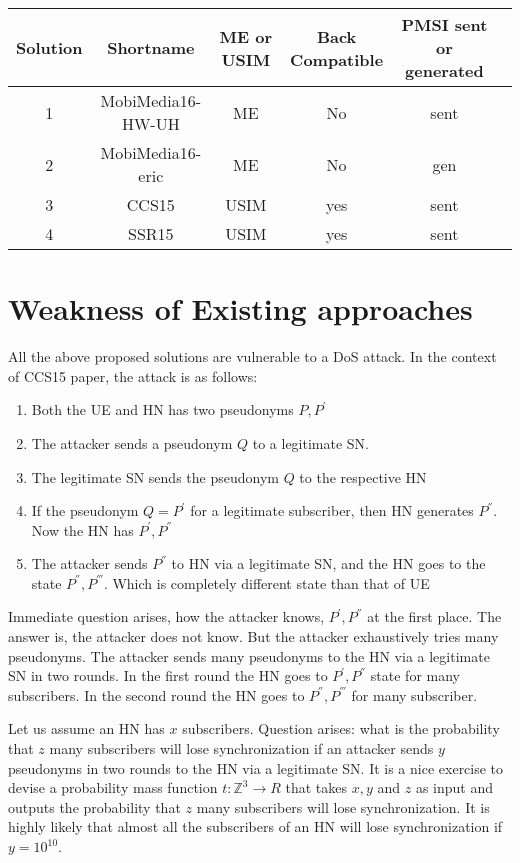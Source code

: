 \documentclass[runningheads,a4paper]{llncs} %
\begin{document}
\begin{center}
\begin{tabular}{ |c|c|c|c|c|c|} 
\hline
Solution & Shortname & ME or USIM & Back Compatible & PMSI sent or generated \\
\hline
1 & MobiMedia16-HW-UH & ME & No & sent\\ 
\hline
2 & MobiMedia16-eric  & ME & No & gen\\ 
\hline
3 & CCS15 & USIM & yes & sent\\ 
\hline
4 & SSR15 & USIM & yes & sent\\ 
\hline
\end{tabular}
\end{center}

\section{Weakness of Existing approaches}
All the above proposed solutions are vulnerable to a DoS attack. In the context of CCS15 paper, the attack is as follows:

\begin{enumerate}
\item Both the UE and HN has two pseudonyms $P,P^{'}$
\item The attacker sends a pseudonym $Q$ to a legitimate SN.
\item The legitimate SN sends the pseudonym $Q$ to the respective HN
\item If the pseudonym $Q = P^{'}$ for a legitimate subscriber, then HN generates $P^{''}$. Now the HN has $P^{'},P^{''}$ 
\item The attacker sends $P^{''}$ to HN via a legitimate SN, and the HN goes to the state $P^{''},P^{'''}$. Which is completely different state than that of UE 
\end{enumerate}

Immediate question arises, how the attacker knows, $P^{'},P^{''}$ at the first place. The answer is, the attacker does not know. But the attacker exhaustively tries many pseudonyms. The attacker sends many pseudonyms to the HN via a legitimate SN in two rounds. In the first round the HN goes to $P^{'},P^{''}$ state for many subscribers. In the second round the HN goes to $P^{''},P^{'''}$ for many subscriber.

Let us assume an HN has $x$ subscribers. Question arises: what is the probability that $z$ many subscribers will lose synchronization if an attacker sends $y$ pseudonyms in two rounds to the HN via a legitimate SN. It is a nice exercise to devise a probability mass function $t:\mathbb{Z}^3 \rightarrow R$ that takes $x,y$ and $z$ as input and outputs the probability that $z$ many subscribers will lose synchronization. It is highly likely that almost all the subscribers of an HN will lose synchronization if $y=10^{10}$.
\end{document}

